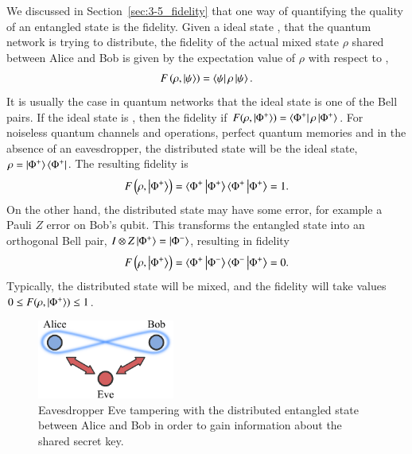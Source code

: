 We discussed in Section~\ref{sec:3-5_fidelity} that one way of quantifying the quality of an entangled state is the fidelity.
Given a ideal state \ket{\psi}, that the quantum network is trying to distribute, the fidelity of the actual mixed state $\rho$ shared between Alice and Bob is given by the expectation value of $\rho$ with respect to \ket{\psi},
\begin{equation}
    F \left( \rho, \left| \psi \right\rangle \right) = \left\langle \psi \right|\rho\left| \psi \right\rangle.
\end{equation}
It is usually the case in quantum networks that the ideal state is one of the Bell pairs.
If the ideal state is \ket{\Phi^+}, then the fidelity if $F (\rho, \left| \Phi^+ \right\rangle) = \left\langle \Phi^+ \right|\rho\left| \Phi^+ \right\rangle$.
For noiseless quantum channels and operations, perfect quantum memories and in the absence of an eavesdropper, the distributed state will be the ideal state, $\rho = \left| \Phi^+ \right\rangle\left\langle \Phi^+ \right|$.
The resulting fidelity is
\begin{equation}
    F \left( \rho, \left| \Phi^+ \right\rangle \right) = \langle\Phi^+\left| \Phi^+ \right\rangle \langle\Phi^+\left| \Phi^+ \right\rangle = 1.
\end{equation}
On the other hand, the distributed state may have some error, for example a Pauli $Z$ error on Bob's qubit.
This transforms the entangled state into an orthogonal Bell pair, $I \otimes Z \left| \Phi^+ \right\rangle = \left| \Phi^- \right\rangle$, resulting in fidelity
\begin{equation}
    F \left( \rho, \ket{\Phi^+} \right) = \langle\Phi^+\ket{\Phi^-} \langle\Phi^-\ket{\Phi^+} = 0.
    \label{eq:14-1_fidelity_0}
\end{equation}
Typically, the distributed state will be mixed, and the fidelity will take values $ 0 \leq F(\rho, \left| \Phi^+ \right\rangle) \leq 1$.

\begin{figure}[t]
    \centering
    \includegraphics[width=0.4\textwidth]{lesson14/14-1_QKD.pdf}
    \caption[Eavesdropper Eve]{Eavesdropper Eve tampering with the distributed entangled state between Alice and Bob in order to gain information about the shared secret key.}
    \label{fig:14-1_QKD}
\end{figure}

